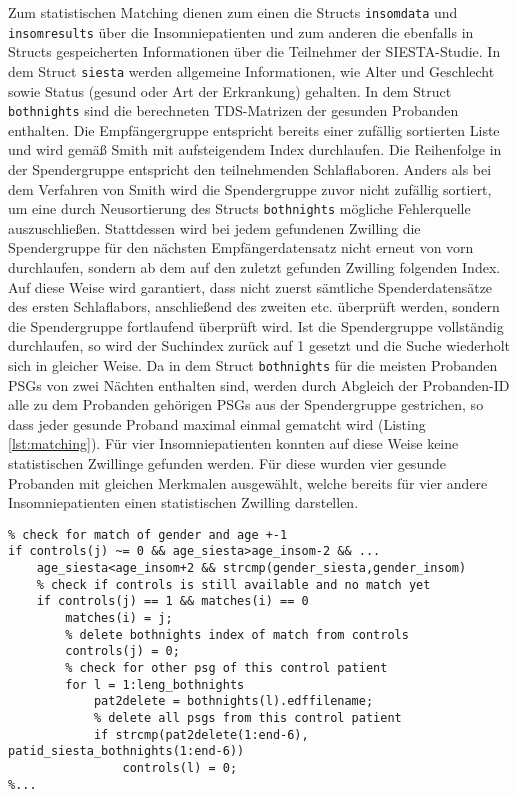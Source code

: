 Zum statistischen Matching dienen zum einen die Structs \texttt{insomdata} und \texttt{insomresults} über die Insomniepatienten und zum anderen die ebenfalls in Structs gespeicherten Informationen über die Teilnehmer der SIESTA-Studie. In dem Struct \texttt{siesta} werden allgemeine Informationen, wie Alter und Geschlecht sowie Status (gesund oder Art der Erkrankung) gehalten. In dem Struct \texttt{bothnights} sind die berechneten \acs{TDS}-Matrizen der gesunden Probanden enthalten. Die Empfängergruppe entspricht bereits einer zufällig sortierten Liste und wird gemäß Smith mit aufsteigendem Index durchlaufen. Die Reihenfolge in der Spendergruppe entspricht den teilnehmenden Schlaflaboren. Anders als bei dem Verfahren von Smith wird die Spendergruppe zuvor nicht zufällig sortiert, um eine durch Neusortierung des Structs \texttt{bothnights} mögliche Fehlerquelle auszuschließen. Stattdessen wird bei jedem gefundenen Zwilling die Spendergruppe für den nächsten Empfängerdatensatz nicht erneut von vorn durchlaufen, sondern ab dem auf den zuletzt gefunden Zwilling folgenden Index. Auf diese Weise wird garantiert, dass nicht zuerst sämtliche Spenderdatensätze des ersten Schlaflabors, anschließend des zweiten etc. überprüft werden, sondern die Spendergruppe fortlaufend überprüft wird. Ist die Spendergruppe vollständig durchlaufen, so wird der Suchindex zurück auf 1 gesetzt und die Suche wiederholt sich in gleicher Weise. Da in dem Struct \texttt{bothnights} für die meisten Probanden \acs{PSG}s von zwei Nächten enthalten sind, werden durch Abgleich der Probanden-ID alle zu dem Probanden gehörigen \acs{PSG}s aus der Spendergruppe gestrichen, so dass jeder gesunde Proband maximal einmal gematcht wird (Listing \ref{lst:matching}). Für vier Insomniepatienten konnten auf diese Weise keine statistischen Zwillinge gefunden werden. Für diese wurden vier gesunde Probanden mit gleichen Merkmalen ausgewählt, welche bereits für vier andere Insomniepatienten einen statistischen Zwilling darstellen.\\

\lstset{language=Matlab}
\begin{lstlisting}[caption={Statistisches Matching in Skript ma\_statistical\_matching.m}, label={lst:matching}]
% ...
% check for match of gender and age +-1
if controls(j) ~= 0 && age_siesta>age_insom-2 && ...
    age_siesta<age_insom+2 && strcmp(gender_siesta,gender_insom)
    % check if controls is still available and no match yet
    if controls(j) == 1 && matches(i) == 0
        matches(i) = j;
        % delete bothnights index of match from controls
        controls(j) = 0;
        % check for other psg of this control patient
        for l = 1:leng_bothnights
            pat2delete = bothnights(l).edffilename;
            % delete all psgs from this control patient
            if strcmp(pat2delete(1:end-6), patid_siesta_bothnights(1:end-6))
                controls(l) = 0;
%...
\end{lstlisting}


